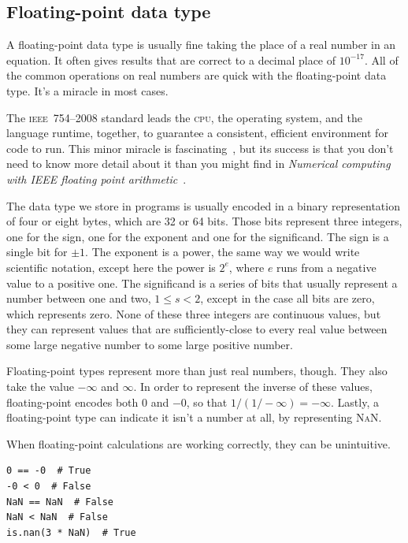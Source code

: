 \documentclass[fleqn,10pt]{olplainarticle}
\newcommand{\cpu}{\textsc{cpu}\xspace}
\newcommand{\nan}{\textsc{NaN}\xspace}
\newcommand{\ieee}{\textsc{ieee}\xspace}
\begin{document}
\subsection{Floating-point data type}

A floating-point data type is usually fine taking the place of a real number
in an equation. It often gives results that are correct to a decimal place
of $10^{-17}.$ All of the common operations on real numbers are quick with
the floating-point data type. It's a miracle in most cases.

The \ieee~754--2008 standard leads the \cpu, the operating system, and 
the language runtime, together, to guarantee a consistent, efficient environment
for code to run. This minor miracle is fascinating~\citep{muller2018handbook},
but its success is that you don't need to know more detail about it than
you might find in \emph{Numerical computing with IEEE floating point arithmetic}~\citep{overton2001numerical,goldberg1991every}.

The data type we store in programs is usually encoded in a binary representation
of four or eight bytes, which are 32 or 64 bits. Those bits represent three integers,
one for the sign, one for the exponent and one for the significand. The sign is
a single bit for $\pm 1$. The exponent is a power, the same way we would write
scientific notation, except here the power is $2^e$, where $e$ runs from a
negative value to a positive one. The significand is a series of bits that
usually represent a number between one and two, $1 \le s < 2$, except in the
case all bits are zero, which represents zero. None of these three
integers are continuous values, but they can represent values that are
sufficiently-close to every real value between some large negative number
to some large positive number.

Floating-point types represent more than just real numbers, though. They
also take the value $-\infty$ and $\infty$. In order to represent the inverse
of these values, floating-point encodes both $0$ and $-0$, so that $1/(1 / -\infty)=-\infty$.
Lastly, a floating-point type can indicate it isn't a number at all,
by representing \nan.

When floating-point calculations are working correctly, they can
be unintuitive.

\begin{lstlisting}
0 == -0  # True
-0 < 0  # False
NaN == NaN  # False
NaN < NaN  # False
is.nan(3 * NaN)  # True
\end{lstlisting}
\end{document}
